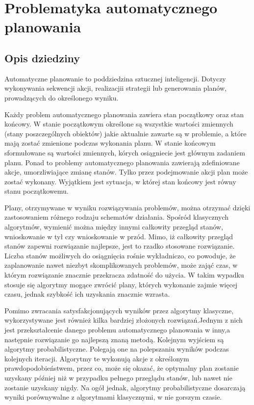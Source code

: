 \chapter{Problematyka automatycznego planowania}
\section{Opis dziedziny}
Automatyczne planowanie to poddziedzina sztucznej inteligencji. Dotyczy wykonywania sekwencji akcji, realizacjii strategii lub generowania planów, prowadzących do określonego wyniku.

Każdy problem automatycznego planowania zawiera stan początkowy oraz stan końcowy. W stanie początkowym określone są wszystkie wartości zmiennych (stany poszczególnych obiektów) jakie aktualnie zawarte są w problemie, a które mają zostać zmienione podczas wykonania planu. W stanie końcowym sformułowane są wartości zmiennych, kórych osiągniecie jest głównym zadaniem planu. Ponad to problemy automatycznego planowania zawierają zdefiniowane akcje, umorzliwiające zmianę stanów. Tylko przez podejmowanie akcji plan może zostać wykonany. Wyjątkiem jest sytuacja, w której stan końcowy jest równy stanu początkowemu.

Plany, otrzymywane w wyniku rozwiązywania problemów, można otrzymać dzięki zastosowaniem różnego rodzaju schematów działania. Spośród klasycznych algorytmów, wymienić można między innymi całkowity przegląd stanów, wnioskowanie w tył czy wnioskowanie w przód. Mimo, iż całkowity przegląd stanów zapewni rozwiązanie najlepsze, jest to rzadko stosowane rozwiązanie. Liczba stanów możliwych do osiągnięcia rośnie wykładniczo, co powoduje, że zaplanowanie nawet niezbyt skomplikowanych problemów, może zająć czas, w którym rozwiązanie znacznie przekracza zdatność do użycia. W takim wypadku stosuje się algorytmy mogące zwrócić plany, których wykonanie zajmie więcej czasu, jednak szybkość ich uzyskania znacznie wzrasta.

Pomimo zwracania satysfakcjonujących wyników przez algorytmy klasyczne, wykorzystywane jest również kilka bardziej złożonych rozwiązań.Jednym z nich jest przekształcenie danego problemu automatycznego planowania w inny,a następnie  rozwiązanie go najlepszą znaną metodą. Kolejnym wyjściem są algorytmy probabilistyczne. Polegają one na polepszaniu wyników podczas kolejnych iteracji. Algorytmy te wykonują akcje z określonym prawdopodobieństwem, przez co, może się okazać, że optymalny plan zostanie uzyskany później niż w przypadku pełnego przeglądu stanów, lub nawet nie zostanie uzyskany nigdy. Na ogół jednak, algorytmy probabilistyczne dosarczają wyniki porównywalne z algorytmami klasycznymi, w nie gorszym czasie.

